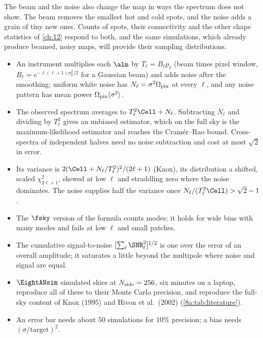 The beam and the noise also change the map in ways the spectrum does not show. The beam
removes the smallest hot and cold spots, and the noise adds a grain of tiny new ones. Counts
of spots, their connectivity and the other shape statistics of \cref{ch:12} respond to both,
and the same simulations, which already produce beamed, noisy maps, will provide their
sampling distributions.

\begin{recap}
\begin{itemize}
  \item An instrument multiplies each $\alm$ by $T_\ell=B_\ell p_\ell$ (beam times pixel window,
        $B_\ell=e^{-\ell(\ell+1)\sigma_b^2/2}$ for a Gaussian beam) and adds noise after the
        smoothing; uniform white noise has $N_\ell=\sigma^2\Omega_{\rm pix}$ at every $\ell$, and
        any noise pattern has mean power $\Omega_{\rm pix}\langle\sigma^2\rangle$.
  \item The observed spectrum averages to $T_\ell^2\Cell+N_\ell$. Subtracting $N_\ell$ and dividing
        by $T_\ell^2$ gives an unbiased estimator, which on the full sky is the maximum-likelihood
        estimator and reaches the Cram\'er--Rao bound. Cross-spectra of independent halves need
        no noise subtraction and cost at most $\sqrt2$ in error.
  \item Its variance is $2(\Cell+N_\ell/T_\ell^2)^2/(2\ell+1)$ (Knox), its distribution a shifted,
        scaled $\chi^2_{2\ell+1}$, skewed at low $\ell$ and straddling zero where the noise
        dominates. The noise supplies half the variance once $N_\ell/(T_\ell^2\Cell)>\sqrt2-1$.
  \item The $\fsky$ version of the formula counts modes; it holds for wide bins with many modes
        and fails at low $\ell$ and small patches.
  \item The cumulative signal-to-noise $[\sum_\ell\SNR_\ell^2]^{1/2}$ is one over the error of an
        overall amplitude; it saturates a little beyond the multipole where noise and signal
        are equal.
  \item $\EightANsim$ simulated skies at $N_{\rm side}=256$, six minutes on a laptop, reproduce all
        of these to their Monte Carlo precision, and reproduce the full-sky content of Knox (1995)
        and Hivon et al.\ (2002) (\cref{8a:tab:literature}).
  \item An error bar needs about $50$ simulations for $10\%$ precision; a bias needs
        $(\sigma/\text{target})^2$.
\end{itemize}
\end{recap}
